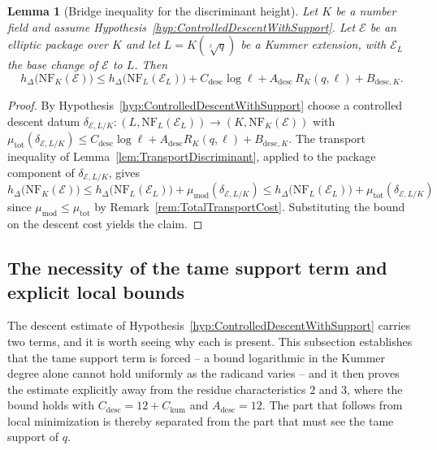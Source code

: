 \documentclass[10pt, reqno]{amsart}
\theoremstyle{plain}
\newtheorem{lemma}[theorem]{Lemma}
\theoremstyle{definition}
\theoremstyle{plain}
\begin{document}
\begin{lemma}[Bridge inequality for the discriminant height]\label{lem:BridgeDescentHeight}
Let $K$ be a number field and assume Hypothesis~\ref{hyp:ControlledDescentWithSupport}. Let $\mathcal{E}$ be an elliptic package over $K$ and let $L=K(\sqrt[\ell]{q})$ be a Kummer extension, with $\mathcal{E}_L$ the base change of $\mathcal{E}$ to $L$. Then
\[
  h_\Delta\bigl(\mathrm{NF}_K(\mathcal{E})\bigr)
  \le
  h_\Delta\bigl(\mathrm{NF}_L(\mathcal{E}_L)\bigr)
  + C_{\mathrm{desc}}\log \ell
  + A_{\mathrm{desc}}\,R_{K}(q,\ell)
  + B_{\mathrm{desc},K}.
\]
\end{lemma}

\begin{proof}
By Hypothesis~\ref{hyp:ControlledDescentWithSupport} choose a controlled descent datum $\delta_{\mathcal{E},L/K} \colon (L,\mathrm{NF}_L(\mathcal{E}_L)) \to (K,\mathrm{NF}_K(\mathcal{E}))$ with $\mu_{\mathrm{tot}}(\delta_{\mathcal{E},L/K}) \le C_{\mathrm{desc}}\log \ell + A_{\mathrm{desc}}R_{K}(q,\ell) + B_{\mathrm{desc},K}$. The transport inequality of Lemma~\ref{lem:TransportDiscriminant}, applied to the package component of $\delta_{\mathcal{E},L/K}$, gives
\[
  h_\Delta\bigl(\mathrm{NF}_K(\mathcal{E})\bigr)
  \le
  h_\Delta\bigl(\mathrm{NF}_L(\mathcal{E}_L)\bigr)
  + \mu_{\mathrm{mod}}(\delta_{\mathcal{E},L/K})
  \le
  h_\Delta\bigl(\mathrm{NF}_L(\mathcal{E}_L)\bigr)
  + \mu_{\mathrm{tot}}(\delta_{\mathcal{E},L/K})
\]
since $\mu_{\mathrm{mod}} \le \mu_{\mathrm{tot}}$ by Remark~\ref{rem:TotalTransportCost}. Substituting the bound on the descent cost yields the claim.
\end{proof}

\subsection{The necessity of the tame support term and explicit local bounds}\label{subsec:ControlledDescentUniformity}

The descent estimate of Hypothesis~\ref{hyp:ControlledDescentWithSupport} carries two terms, and it is worth seeing why each is present. This subsection establishes that the tame support term is forced -- a bound logarithmic in the Kummer degree alone cannot hold uniformly as the radicand varies -- and it then proves the estimate explicitly away from the residue characteristics $2$ and $3$, where the bound holds with $C_{\mathrm{desc}}=12+C_{\mathrm{kum}}$ and $A_{\mathrm{desc}}=12$. The part that follows from local minimization is thereby separated from the part that must see the tame support of $q$.
\end{document}
